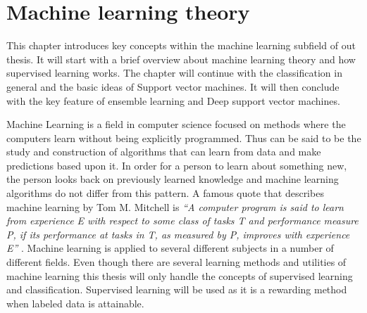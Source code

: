 \chapter{Machine learning theory}
\label{chapter:mltheory}

This chapter introduces key concepts within the machine learning subfield of out thesis. It will start with a brief overview about machine learning theory and how supervised learning works. The chapter will continue with the classification in general and the basic ideas of Support vector machines. It will then conclude with the key feature of ensemble learning and Deep support vector machines. 


Machine Learning is a field in computer science focused on methods where the computers learn without being explicitly programmed. Thus can be said to be the study and construction of algorithms that can learn from data and make predictions based upon it. In order for a person to learn about something new, the person looks back on previously learned knowledge and machine learning algorithms do not differ from this pattern. A famous quote that describes machine learning by Tom M. Mitchell is \textit{``A computer program is said to learn from experience E with respect to some class of tasks T and performance measure P, if its performance at tasks in T, as measured by P, improves with experience E''} \cite{Mitchell:1997:ML:541177}. 
Machine learning is applied to several different subjects in a number of different fields. Even though there are several learning methods and utilities of machine learning this thesis will only handle the concepts of supervised learning and classification. Supervised learning will be used as it is a rewarding method when labeled data is attainable.















